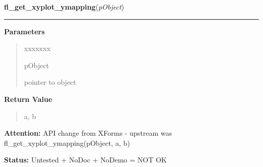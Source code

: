 \hspace{.8\funcindent}\begin{boxedminipage}{\funcwidth}

    \raggedright \textbf{fl\_get\_xyplot\_ymapping}(\textit{pObject})

    \vspace{-1.5ex}

    \rule{\textwidth}{0.5\fboxrule}
\setlength{\parskip}{2ex}
\setlength{\parskip}{1ex}
      \textbf{Parameters}
      \vspace{-1ex}

      \begin{quote}
        \begin{Ventry}{xxxxxxx}

          \item[pObject]

          pointer to object

        \end{Ventry}

      \end{quote}

      \textbf{Return Value}
    \vspace{-1ex}

      \begin{quote}
      a, b

      \end{quote}

\textbf{Attention:} API change from XForms - upstream was fl\_get\_xyplot\_ymapping(pObject, a,
b)



\textbf{Status:} Untested + NoDoc + NoDemo = NOT OK



    \end{boxedminipage}

    \label{xformslib:library:fl_set_xyplot_keys}

    \vspace{0.5ex}

